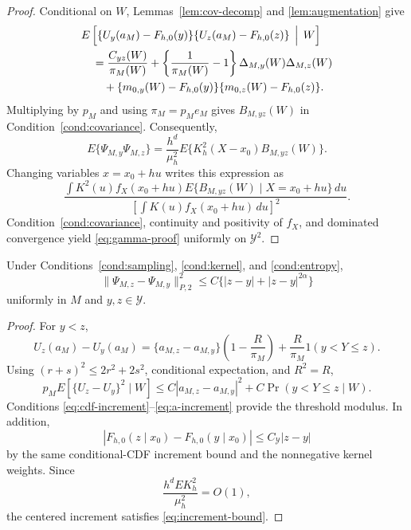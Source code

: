 \begin{proof}
Conditional on \(W\), Lemmas~\ref{lem:cov-decomp} and \ref{lem:augmentation} give
\begin{align*}
&E\left[
\{U_y(a_M)-F_{h,0}(y)\}
\{U_z(a_M)-F_{h,0}(z)\}
\,\Bigm|\,W
\right]\\
&\quad=
\frac{C_{yz}(W)}{\pi_M(W)}
+
\left\{\frac1{\pi_M(W)}-1\right\}
\Delta_{M,y}(W)\Delta_{M,z}(W)\\
&\qquad+
\{m_{0,y}(W)-F_{h,0}(y)\}
\{m_{0,z}(W)-F_{h,0}(z)\}.
\end{align*}
Multiplying by \(p_M\) and using \(\pi_M=p_Me_M\) gives \(B_{M,yz}(W)\) in Condition~\ref{cond:covariance}. Consequently,
\[
E\{\Psi_{M,y}\Psi_{M,z}\}
=
\frac{h^d}{\mu_h^2}
E\{K_h^2(X-x_0)B_{M,yz}(W)\}.
\]
Changing variables \(x=x_0+hu\) writes this expression as
\[
\frac{
\int K^2(u)f_X(x_0+hu)
E\{B_{M,yz}(W)\mid X=x_0+hu\}\,du
}{
\left[\int K(u)f_X(x_0+hu)\,du\right]^2
}.
\]
Condition~\ref{cond:covariance}, continuity and positivity of \(f_X\), and dominated convergence yield \eqref{eq:gamma-proof} uniformly on \(\mathcal Y^2\).
\end{proof}

\begin{lemma}
\label{lem:increments}
Under Conditions~\ref{cond:sampling}, \ref{cond:kernel}, and \ref{cond:entropy},
\begin{equation}
\|\Psi_{M,z}-\Psi_{M,y}\|_{P,2}^2
\le
C\{|z-y|+|z-y|^{2\alpha}\}
\label{eq:increment-bound}
\end{equation}
uniformly in \(M\) and \(y,z\in\mathcal Y\).
\end{lemma}

\begin{proof}
For \(y<z\),
\begin{equation}
U_z(a_M)-U_y(a_M)
=
\{a_{M,z}-a_{M,y}\}
\left(1-\frac{R}{\pi_M}\right)
+
\frac{R}{\pi_M}1(y<Y\le z).
\label{eq:increment-decomp}
\end{equation}
Using \((r+s)^2\le2r^2+2s^2\), conditional expectation, and \(R^2=R\),
\[
p_ME[\{U_z-U_y\}^2\mid W]
\le
C|a_{M,z}-a_{M,y}|^2
+
C\Pr(y<Y\le z\mid W).
\]
Conditions \eqref{eq:cdf-increment}--\eqref{eq:a-increment} provide the threshold modulus. In addition,
\[
|F_{h,0}(z\mid x_0)-F_{h,0}(y\mid x_0)|
\le C_{\mathcal Y}|z-y|
\]
by the same conditional-CDF increment bound and the nonnegative kernel weights. Since
\[
\frac{h^dE K_h^2}{\mu_h^2}=O(1),
\]
the centered increment satisfies \eqref{eq:increment-bound}.
\end{proof}

